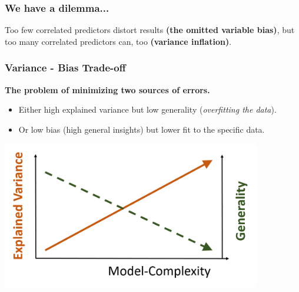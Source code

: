 \documentclass{beamer}
\begin{document}
\begin{frame}
    \frametitle{We have a dilemma...}
    \large{Too few correlated predictors distort results \textbf{(the omitted variable bias)}, but too many correlated predictors can, too \textbf{(variance inflation)}.}
\end{frame}

\begin{frame}
  \frametitle{Variance - Bias Trade-off}
  \textbf{The problem of minimizing two sources of errors.}
  
  \begin{itemize}
    \item Either high explained variance but low generality (\textit{overfitting the data}).
    \item Or low bias (high general insights) but lower fit to the specific data.
  \end{itemize}
  
  \begin{center}
    \includegraphics[width=0.85\textwidth]{figures/var-bias-tradeoff.png} 
  \end{center}
\end{frame}
\end{document}
